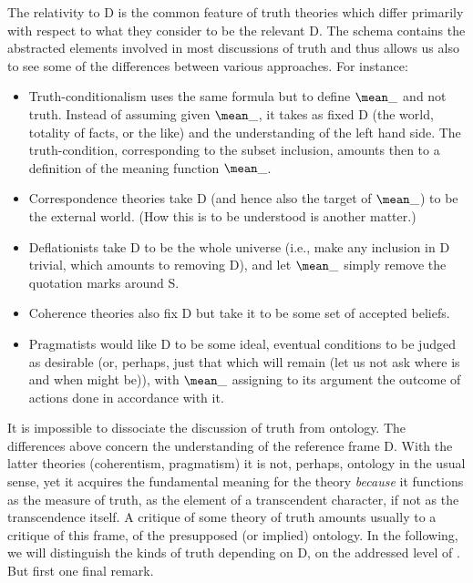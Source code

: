 The relativity to D is the common feature of truth theories which differ
primarily with respect to what they consider to be the relevant D.  The schema
 contains the abstracted elements involved in most discussions
of truth and thus allows us also to see some of the differences between various
approaches. For instance:

\begin{itemize}
\item
Truth-conditionalism uses the same formula but to define $\mean\_$ and not
truth. Instead of assuming given $\mean\_$, it takes as fixed D (the world,
totality of facts, or the like) and the understanding of the left hand side. The
truth-condition, corresponding to the subset inclusion, amounts then to a
definition of the meaning function $\mean\_$.  
\item  
Correspondence theories take D (and hence also the target of
$\mean\_$) to be the external world. (How this is to be understood is another
matter.) 
\item  
Deflationists take D to be the whole universe (i.e., make any inclusion in D
trivial, which amounts to removing D), and let $\mean\_$ simply remove the
quotation marks around S.
\item  
Coherence theories also fix D but take it to be some set of accepted beliefs.
\item  
Pragmatists would like D to be some ideal, eventual conditions to be judged as
desirable (or, perhaps, just that which will remain 
(let us not ask where  is and when  might be)), with
$\mean\_$ assigning to its argument the outcome of actions done in accordance
with it. 
\end{itemize}
It is impossible to dissociate the discussion of truth from ontology.  The
differences above concern the understanding of the reference frame D. With the
latter theories (coherentism, pragmatism) it is not, perhaps, ontology in the
usual sense, yet it acquires the fundamental meaning for the theory {\em because}
it functions as the measure of truth, as the element of a transcendent character,
if not as the transcendence itself.  A critique of some theory of truth amounts
usually to a critique of this frame, of the presupposed (or implied)
ontology. In the following, we will distinguish the kinds of truth
depending on D, on the addressed level of . But first one final remark.

